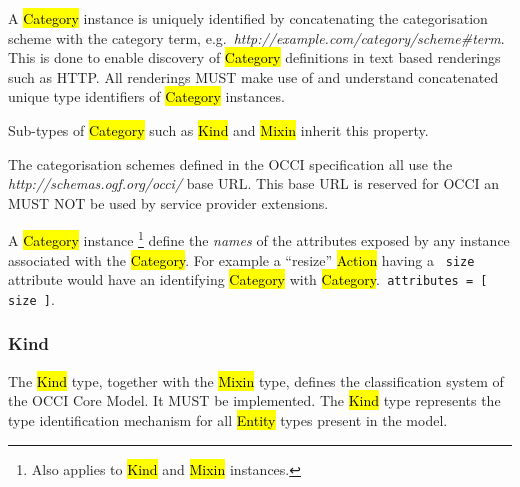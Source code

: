 \documentclass[10pt,a4paper]{article}
\begin{document}

A \hl{Category} instance is uniquely identified by concatenating the
categorisation scheme with the category term,
e.g.~\textit{http://example.com/category/scheme\#term}.  This is done
to enable discovery of \hl{Category} definitions in text based
renderings such as HTTP. All renderings MUST make use of and
understand concatenated unique type identifiers of \hl{Category}
instances.

Sub-types of \hl{Category} such as \hl{Kind} and \hl{Mixin} inherit
this property.

The categorisation schemes defined in the OCCI specification all use
the \textit{http://schemas.ogf.org/occi/} base URL. This base URL is
reserved for OCCI an MUST NOT be used by service provider extensions.

A \hl{Category} instance
\footnote{Also applies to \hl{Kind} and \hl{Mixin} instances.}
define the {\em names} of the attributes exposed by any instance associated
with the \hl{Category}.  For example a ``resize'' \hl{Action} having a {\tt
size} attribute would have an identifying \hl{Category} with \hl{Category}.{\tt
attributes = [ size ]}.

\subsubsection{Kind}
\label{sec:kind}

The \hl{Kind} type, together with the \hl{Mixin} type, defines the
classification system of the OCCI Core Model. It MUST be
implemented. The \hl{Kind} type represents the type identification
mechanism for all \hl{Entity} types present in the model.
\end{document}
